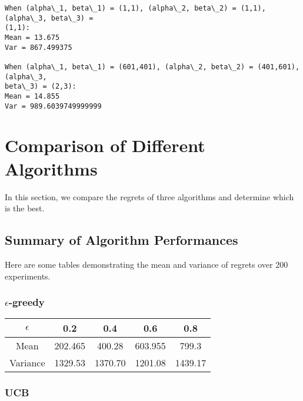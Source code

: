 \documentclass[11pt]{article}
\begin{document}
    \begin{Verbatim}[commandchars=\\\{\}]
When (alpha\_1, beta\_1) = (1,1), (alpha\_2, beta\_2) = (1,1), (alpha\_3, beta\_3) =
(1,1):
Mean = 13.675
Var = 867.499375

When (alpha\_1, beta\_1) = (601,401), (alpha\_2, beta\_2) = (401,601), (alpha\_3,
beta\_3) = (2,3):
Mean = 14.855
Var = 989.6039749999999

    \end{Verbatim}

    \hypertarget{comparison-of-different-algorithms}{%
\section{Comparison of Different
Algorithms}\label{comparison-of-different-algorithms}}

    In this section, we compare the regrets of three algorithms and
determine which is the best.

    \hypertarget{summary-of-algorithm-performances}{%
\subsection{Summary of Algorithm
Performances}\label{summary-of-algorithm-performances}}

Here are some tables demonstrating the mean and variance of regrets over
200 experiments.

    \hypertarget{epsilon-greedy}{%
\subsubsection{\texorpdfstring{\(\epsilon\)-greedy}{\textbackslash epsilon-greedy}}\label{epsilon-greedy}}

\begin{table}[htbp]
    \centering
    \begin{tabular}{|c|c|c|c|c|}
        \hline 
        \(\epsilon\) & 0.2 & 0.4 & 0.6 & 0.8 \\
        \hline 
        Mean & 202.465 & 400.28 & 603.955 & 799.3 \\ 
        \hline
        Variance & 1329.53 & 1370.70 & 1201.08 & 1439.17 \\
        \hline
    \end{tabular} 
\end{table}

\hypertarget{ucb}{%
\subsubsection{UCB}\label{ucb}}
\end{document}

